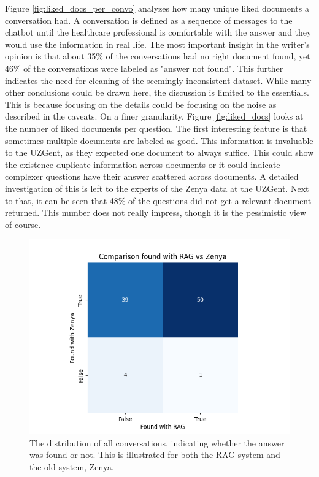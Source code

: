 Figure \ref{fig:liked_docs_per_convo} analyzes how many unique liked documents a conversation had. A conversation is defined as a sequence of messages to the chatbot until the healthcare professional is comfortable with the answer and they would use the information in real life. The most important insight in the writer's opinion is that about 35\% of the conversations had no right document found, yet 46\% of the conversations were labeled as "answer not found". This further indicates the need for cleaning of the seemingly inconsistent dataset. While many other conclusions could be drawn here, the discussion is limited to the essentials. This is because focusing on the details could be focusing on the noise as described in the caveats. On a finer granularity, Figure \ref{fig:liked_docs} looks at the number of liked documents per question. The first interesting feature is that sometimes multiple documents are labeled as good. This information is invaluable to the UZGent, as they expected one document to always suffice. This could show the existence duplicate information across documents or it could indicate complexer questions have their answer scattered across documents. A detailed investigation of this is left to the experts of the Zenya data at the UZGent. Next to that, it can be seen that 48\% of the questions did not get a relevant document returned. This number does not really impress, though it is the pessimistic view of course.

\begin{figure}[H]
    \centerline{\includegraphics[width=0.9\linewidth]{fig/RAG_found_plot.png}}
    \caption{The distribution of all conversations, indicating whether the answer was found or not. This is illustrated for both the RAG system and the old system, Zenya.}
    \label{fig:found_rate}
\end{figure}

